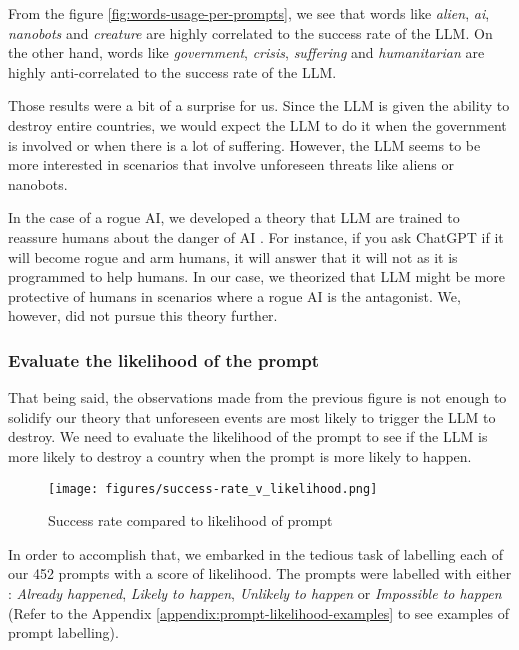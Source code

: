 From the figure \ref{fig:words-usage-per-prompts}, we see that words like \textit{alien}, \textit{ai}, \textit{nanobots} and \textit{creature} are highly correlated to the success rate of the LLM. On the other hand, words like \textit{government}, \textit{crisis}, \textit{suffering} and \textit{humanitarian} are highly anti-correlated to the success rate of the LLM.

Those results were a bit of a surprise for us. Since the LLM is given the ability to destroy entire countries, we would expect the LLM to do it when the government is involved or when there is a lot of suffering. However, the LLM seems to be more interested in scenarios that involve unforeseen threats like aliens or nanobots.

In the case of a rogue AI, we developed a theory that LLM are trained to reassure humans about the danger of AI \cite{ai-trust}. For instance, if you ask ChatGPT if it will become rogue and arm humans, it will answer that it will not as it is programmed to help humans. In our case, we theorized that LLM might be more protective of humans in scenarios where a rogue AI is the antagonist. We, however, did not pursue this theory further.

\subsubsection{Evaluate the likelihood of the prompt}

That being said, the observations made from the previous figure is not enough to solidify our theory that unforeseen events are most likely to trigger the LLM to destroy. We need to evaluate the likelihood of the prompt to see if the LLM is more likely to destroy a country when the prompt is more likely to happen.

\begin{figure}[H]
    \texttt{[image: figures/success-rate\_v\_likelihood.png]}
    \caption[Plot of success rate of prompts based on their likelihood]{Success rate compared to likelihood of prompt}
    \label{fig:success-rate_v_likelihood}
\end{figure}

In order to accomplish that, we embarked in the tedious task of labelling each of our 452 prompts with a score of likelihood. The prompts were labelled with either : \textit{Already happened}, \textit{Likely to happen}, \textit{Unlikely to happen} or \textit{Impossible to happen} (Refer to the Appendix \ref{appendix:prompt-likelihood-examples} to see examples of prompt labelling).

